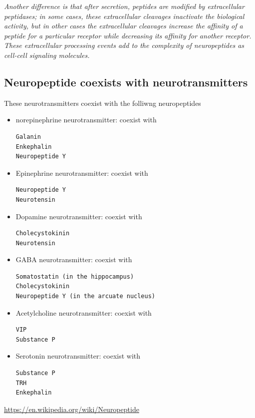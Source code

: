 {\it Another difference is that after secretion, peptides are modified by
extracellular peptidases; in some cases, these extracellular cleavages
inactivate the biological activity, but in other cases the extracellular
cleavages increase the affinity of a peptide for a particular receptor while
decreasing its affinity for another receptor. These extracellular processing
events add to the complexity of neuropeptides as cell-cell signaling molecules.}




\subsection{Neuropeptide coexists with neurotransmitters}

These neurotransmitters coexist with the folliwng neuropeptides 
\begin{itemize}
  \item norepinephrine neurotransmitter: coexist with
  \begin{verbatim}
Galanin
Enkephalin
Neuropeptide Y
  \end{verbatim}

  \item Epinephrine neurotransmitter: coexist with
  \begin{verbatim}
Neuropeptide Y
Neurotensin  
  \end{verbatim}

  \item Dopamine neurotransmitter: coexist with
  \begin{verbatim}
Cholecystokinin
Neurotensin  
  \end{verbatim}

  \item GABA neurotransmitter: coexist with
  \begin{verbatim}
Somatostatin (in the hippocampus)
Cholecystokinin
Neuropeptide Y (in the arcuate nucleus)  
  \end{verbatim}

  \item Acetylcholine neurotransmitter: coexist with
  \begin{verbatim}
VIP
Substance P  
  \end{verbatim}


  \item Serotonin neurotransmitter: coexist with
  \begin{verbatim}
Substance P
TRH
Enkephalin
  \end{verbatim}

\end{itemize}
\url{https://en.wikipedia.org/wiki/Neuropeptide}


